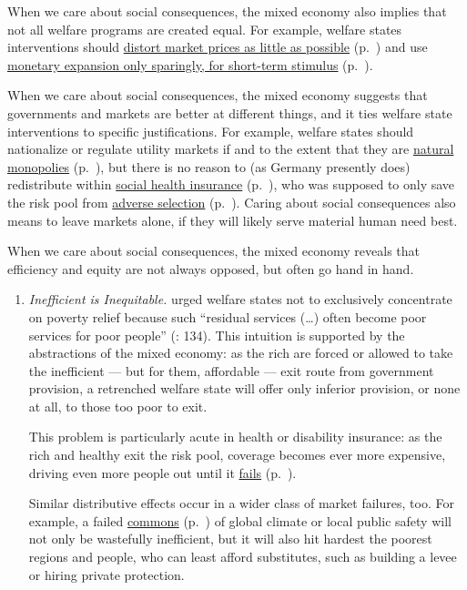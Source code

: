 \begin{enumerate}
	When we care about social consequences, the mixed economy also implies that not all welfare programs are created equal. For example, welfare states interventions should \hyperref[sec:minimalDWL]{distort market prices as little as possible} (p.~\pageref{sec:minimalDWL}) and use \hyperref[sec:price-stability]{monetary expansion only sparingly, for short-term stimulus} (p.~\pageref{sec:price-stability}).
	
	When we care about social consequences, the mixed economy suggests that  governments and markets are better at different things, and it ties welfare state interventions to specific justifications. For example, welfare states should nationalize or regulate utility markets if and to the extent that they are \hyperref[sec:natural-monopoly]{natural monopolies} (p.~\pageref{sec:natural-monopoly}), but there is no reason to (as Germany presently does) redistribute within \hyperref[sec:state-insurance]{social health insurance} (p.~\pageref{sec:state-insurance}), who was supposed to only save the risk pool from \hyperref[sec:adverse-selection]{adverse selection} (p.~\pageref{sec:adverse-selection}). Caring about social consequences also means to leave markets alone, if they will likely serve material human need best.
	
	When we care about social consequences, the mixed economy reveals that efficiency and equity are not always opposed, but often go hand in hand. 
	\begin{enumerate}
		\item \emph{Inefficient is Inequitable.} \citeauthor{Titmuss1974} urged welfare states not to exclusively concentrate on poverty relief because such ``residual services (\ldots) often become poor services for poor people'' (\citeyear{Titmuss1974}: 134). This intuition is supported by the abstractions of the mixed economy: as the rich are forced or allowed to take the inefficient --- but for them, affordable --- exit route from government provision, a retrenched welfare state will offer only inferior provision, or none at all, to those too poor to exit. 
		
		This problem is particularly acute in health or disability insurance: as the rich and healthy exit the risk pool, coverage becomes ever more expensive, driving even more people out until it \hyperref[sec:adverse-selection]{fails} (p.~\pageref{sec:adverse-selection}). 
		
		Similar distributive effects occur in a wider class of market failures, too. For example, a failed \hyperref[sec:common-good]{commons} (p.~\pageref{sec:common-good}) of global climate or local public safety will not only be wastefully inefficient, but it will also hit hardest the poorest regions and people, who can least afford substitutes, such as building a levee or hiring private protection. 
		

\end{enumerate}
\end{enumerate}
